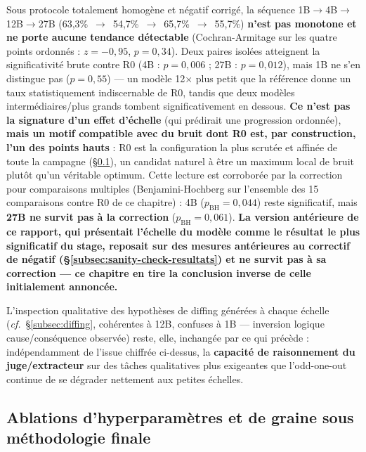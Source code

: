 \documentclass[11pt]{article}
\begin{document}
\begin{resultbox}
Sous protocole totalement homogène et négatif corrigé, la séquence
1B$\to$4B$\to$12B$\to$27B (63,3\%~$\to$~54,7\%~$\to$~65,7\%~$\to$~55,7\%)
\textbf{n'est pas monotone et ne porte aucune tendance détectable}
(Cochran-Armitage sur les quatre points ordonnés : $z=-0{,}95$,
$p=0{,}34$). Deux paires isolées atteignent la significativité brute contre
R0 (4B : $p=0{,}006$ ; 27B : $p=0{,}012$), mais 1B ne s'en distingue pas
($p=0{,}55$) --- un modèle 12$\times$ plus petit que la référence donne un
taux statistiquement indiscernable de R0, tandis que deux modèles
intermédiaires/plus grands tombent significativement en dessous. \textbf{Ce
n'est pas la signature d'un effet d'échelle} (qui prédirait une progression
ordonnée), \textbf{mais un motif compatible avec du bruit dont R0 est, par
construction, l'un des points hauts} : R0 est la configuration la plus
scrutée et affinée de toute la campagne (\S\ref{subsec:ablations-finales}),
un candidat naturel à être un maximum local de bruit plutôt qu'un véritable
optimum. Cette lecture est corroborée par la correction pour comparaisons
multiples (Benjamini-Hochberg sur l'ensemble des
15 comparaisons contre R0 de ce chapitre) : 4B ($p_\text{BH}=0{,}044$) reste
significatif, mais \textbf{27B ne survit pas à la correction}
($p_\text{BH}=0{,}061$). \textbf{La version antérieure de ce rapport, qui
présentait l'échelle du modèle comme \og{}le résultat le plus significatif
du stage\fg{}, reposait sur des mesures antérieures au correctif de négatif
(\S\ref{subsec:sanity-check-resultats}) et ne survit pas à sa correction ---
ce chapitre en tire la conclusion inverse de celle initialement annoncée.}
\end{resultbox}

L'inspection qualitative des hypothèses de diffing générées à chaque échelle
(\emph{cf.}~\S\ref{subsec:diffing}, cohérentes à 12B, confuses à 1B ---
inversion logique cause/conséquence observée) reste, elle, inchangée par ce
qui précède : indépendamment de l'issue chiffrée ci-dessus, la
\textbf{capacité de raisonnement du juge/extracteur} sur des tâches
qualitatives plus exigeantes que l'odd-one-out continue de se dégrader
nettement aux petites échelles.

\subsection{Ablations d'hyperparamètres et de graine sous méthodologie finale}
\label{subsec:ablations-finales}
\end{document}
